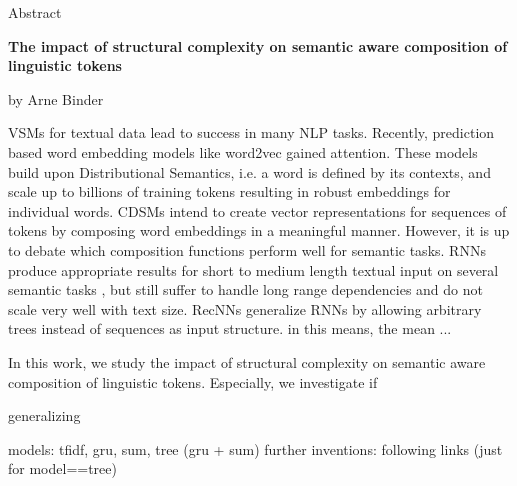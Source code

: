 
\begin{center}
	\huge{Abstract} 
	\vspace{0.5cm}
	 
	\large{\bf{The impact of structural complexity on semantic aware composition of linguistic tokens}} 
	\vspace{0.5cm}

	by Arne Binder \\
\end{center}

\vspace{0.5cm}
\normalsize

\acfp{VSM} for textual data lead to success in many \ac{NLP} tasks. Recently, prediction based word embedding models like word2vec %
gained attention. These models build upon Distributional Semantics, i.e. a word is defined by its contexts, and scale up to billions of training tokens %
resulting in robust embeddings for individual words. 
\acfp{CDSM} intend to create vector representations for sequences of tokens by composing word embeddings in a meaningful manner. However, it is up to debate which composition functions perform well for semantic tasks. \acp{RNN} produce appropriate results for short to medium length textual input on several semantic tasks , but still suffer to handle long range dependencies and do not scale very well with text size. 
\acp{RecNN} generalize \acp{RNN} by allowing arbitrary trees instead of sequences as input structure. in this means, the mean ...

In this work, we study the impact of structural complexity on semantic aware composition of linguistic tokens. Especially, we investigate if 

 generalizing  

models: tfidf, gru, sum, tree (gru + sum)
further inventions: following links (just for model==tree)
 

